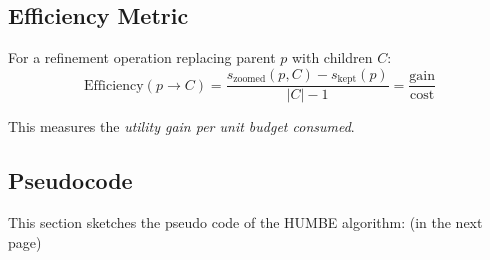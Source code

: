 \documentclass[11pt]{article}
\begin{document}
\subsection{Efficiency Metric}
For a refinement operation replacing parent $p$ with children $C$:
\begin{equation}
\text{Efficiency}(p \to C) = \frac{s_{\text{zoomed}}(p, C) - s_{\text{kept}}(p)}{|C| - 1} = \frac{\text{gain}}{\text{cost}}
\end{equation}

This measures the \emph{utility gain per unit budget consumed}.

\subsection{Pseudocode}
This section sketches the pseudo code of the HUMBE algorithm: (in the next page)
\end{document}
